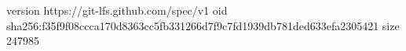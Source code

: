 version https://git-lfs.github.com/spec/v1
oid sha256:f35f9f08ccca170d8363cc5fb331266d7f9c7fd1939db781ded633efa2305421
size 247985
